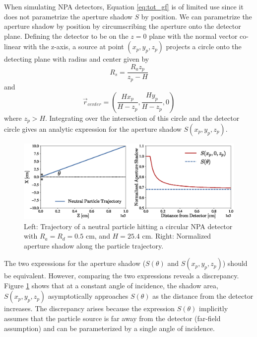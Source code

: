 When simulating NPA detectors, Equation \ref{eq:tot_gf} is of limited use since it does not parametrize the aperture shadow $S$ by position. We can parametrize the aperture shadow by position by circumscribing the aperture onto the detector plane. Defining the detector to be on the $z=0$ plane with the normal vector co-linear with the z-axis, a source at point $(x_p,y_p,z_p)$ projects a circle onto the detecting plane with radius and center given by
\begin{equation}
\label{eq:shadow_radius}
R_s = \frac{R_a z_p}{z_p - H}
\end{equation}
and
\begin{equation}
\label{eq:shadow_center}
\vec{r}_{center} = \left(\frac{H x_p}{H-z_p} , \frac{H y_p}{H-z_p} ,0\right)
\end{equation} 
where $z_p > H$. Integrating over the intersection of this circle and the detector circle gives an analytic expression for the aperture shadow $S(x_p,y_p,z_p)$.

\begin{figure}[h!]
    \centering
    \includegraphics[width=15cm]{figures/aperture_shadow.eps}
    \caption{Left: Trajectory of a neutral particle hitting a circular NPA detector with $R_a=R_d = 0.5$ cm, and $H= 25.4$ cm. Right: Normalized aperture shadow along the particle trajectory.}
    \label{fig:shadow_compare}
\end{figure}
The two expressions for the aperture shadow ($S(\theta)$ and $S(x_p,y_p,z_p)$) should be equivalent. However, comparing the two expressions reveals a discrepancy. 
Figure \ref{fig:shadow_compare} shows that at a constant angle of incidence, the shadow area, $S(x_p,y_p,z_p)$ asymptotically approaches $S(\theta)$ as the distance from the detector increases. The discrepancy arises because the expression $S(\theta)$ implicitly assumes that the particle source is far away from the detector (far-field assumption) and can be parameterized by a single angle of incidence. 

